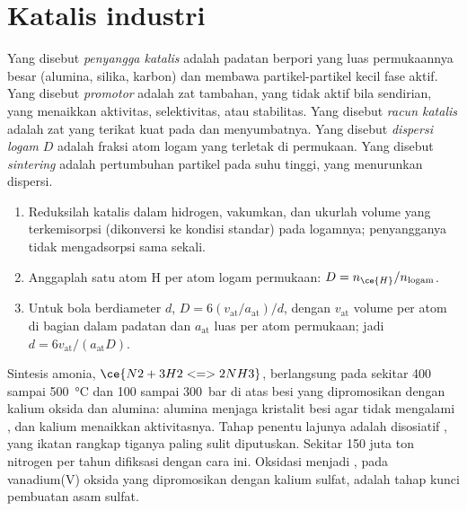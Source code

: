 \section{Katalis industri}

\begin{definition}\label{def:b3:surfaces-catalysis:catalyst-design}
Yang disebut \emph{penyangga katalis} adalah padatan
berpori yang luas permukaannya besar (alumina, silika, karbon) dan membawa
partikel-partikel kecil fase aktif. Yang disebut \emph{promotor}
adalah zat tambahan, yang tidak aktif bila sendirian, yang menaikkan aktivitas,
selektivitas, atau stabilitas. Yang disebut \emph{racun
katalis} adalah zat yang terikat kuat pada  dan
menyumbatnya. Yang disebut \emph{dispersi logam} $D$
adalah fraksi atom logam yang terletak di permukaan. Yang disebut
\emph{sintering} adalah pertumbuhan partikel pada suhu tinggi,
yang menurunkan dispersi.
\end{definition}

\begin{method}\label{met:b3:surfaces-catalysis:dispersion}
\begin{enumerate}
  \item Reduksilah katalis dalam hidrogen, vakumkan, dan ukurlah volume 
        yang terkemisorpsi (dikonversi ke kondisi standar) pada logamnya;
        penyangganya tidak mengadsorpsi sama sekali.
  \item Anggaplah satu atom H per atom logam permukaan: $D = n_{\ce{H}}/n_{\text{logam}}$.
  \item Untuk bola berdiameter $d$, $D = 6(v_{\mathrm{at}}/a_{\mathrm{at}})/d$, dengan $v_{\mathrm{at}}$ volume per atom di
        bagian dalam padatan dan $a_{\mathrm{at}}$ luas per atom permukaan; jadi $d = 6v_{\mathrm{at}}/(a_{\mathrm{at}}D)$.
\end{enumerate}
\end{method}

Sintesis amonia, $\ce{N2 + 3 H2 <=> 2 NH3}$, berlangsung pada sekitar 400 sampai \qty{500}{\celsius} dan 100 sampai
\qty{300}{bar} di atas besi yang dipromosikan dengan kalium oksida dan alumina:
alumina menjaga kristalit besi agar tidak mengalami , dan kalium
menaikkan aktivitasnya. Tahap penentu lajunya adalah  disosiatif ,
yang ikatan rangkap tiganya paling sulit diputuskan. Sekitar 150 juta ton
nitrogen per tahun difiksasi dengan cara ini.
Oksidasi  menjadi , pada vanadium(V) oksida yang dipromosikan
dengan kalium sulfat, adalah tahap kunci pembuatan asam sulfat.

